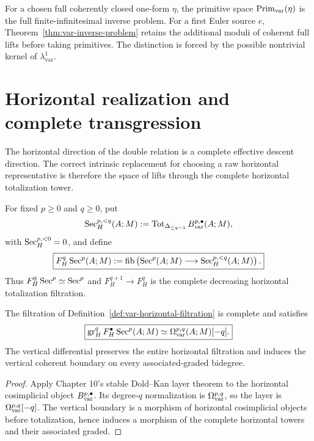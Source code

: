 \begin{remark}
\label{rem:var-two-inverse-problems}
For a chosen full coherently closed one-form \(\eta\), the primitive space \(\operatorname{Prim}_{\mathrm{var}}(\eta)\) is the full finite-infinitesimal inverse problem. For a first Euler source \(e\), Theorem~\ref{thm:var-inverse-problem} retains the additional moduli of coherent full lifts before taking primitives. The distinction is forced by the possible nontrivial kernel of \(\lambda^1_{\mathrm{var}}\).
\end{remark}

\section{Horizontal realization and complete transgression}
\label{sec:var-horizontal-transgression}

The horizontal direction of the double relation is a complete effective descent direction. The correct intrinsic replacement for choosing a raw horizontal representative is therefore the space of lifts through the complete horizontal totalization tower.

\begin{definition}
\label{def:var-horizontal-filtration}
For fixed \(p\ge0\) and \(q\ge0\), put
\[
    \operatorname{Sec}_H^{p,<q}(A;M)
    :=
    \operatorname{Tot}_{\Delta_{\le q-1}}
    B_{\mathrm{var}}^{p,\bullet}(A;M),
\]
with \(\operatorname{Sec}_H^{p,<0}=0\), and define
\[
    \boxed{
    F_H^q\operatorname{Sec}^p(A;M)
    :=
    \operatorname{fib}\left(
      \operatorname{Sec}^p(A;M)
      \longrightarrow
      \operatorname{Sec}_H^{p,<q}(A;M)
    \right).
    }
\]
Thus \(F_H^0\operatorname{Sec}^p\simeq\operatorname{Sec}^p\) and \(F_H^{q+1}\to F_H^q\) is the complete decreasing horizontal totalization filtration.
\end{definition}

\begin{proposition}
\label{prop:var-horizontal-graded}
The filtration of Definition~\ref{def:var-horizontal-filtration} is complete and satisfies
\[
    \boxed{
    \operatorname{gr}_H^qF_H^{\bullet}\operatorname{Sec}^p(A;M)
    \simeq
    \Omega_{\mathrm{var}}^{p,q}(A;M)[-q].
    }
\]
The vertical differential preserves the entire horizontal filtration and induces the vertical coherent boundary on every associated-graded bidegree.
\end{proposition}

\begin{proof}
Apply Chapter 10's stable Dold--Kan layer theorem to the horizontal cosimplicial object \(B_{\mathrm{var}}^{p,\bullet}\). Its degree-\(q\) normalization is \(\Omega_{\mathrm{var}}^{p,q}\), so the layer is \(\Omega_{\mathrm{var}}^{p,q}[-q]\). The vertical boundary is a morphism of horizontal cosimplicial objects before totalization, hence induces a morphism of the complete horizontal towers and their associated graded.
\end{proof}

